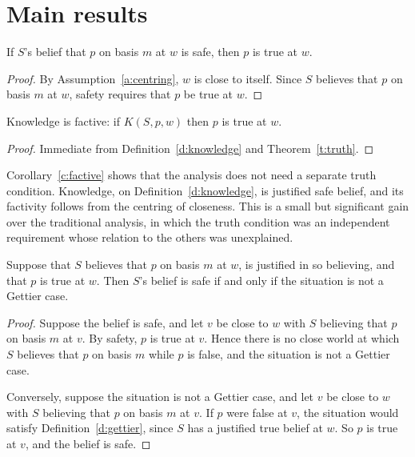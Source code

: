 \documentclass{situationist-preprint}
\begin{document}
\section{Main results}

\begin{theorem}\label{t:truth}
If $S$'s belief that $p$ on basis $m$ at $w$ is safe, then $p$ is true at $w$.
\end{theorem}

\begin{proof}
By Assumption~\ref{a:centring}, $w$ is close to itself. Since $S$ believes that $p$ on basis $m$ at $w$, safety requires that $p$ be true at $w$.
\end{proof}

\begin{corollary}\label{c:factive}
Knowledge is factive: if $K(S,p,w)$ then $p$ is true at $w$.
\end{corollary}

\begin{proof}
Immediate from Definition~\ref{d:knowledge} and Theorem~\ref{t:truth}.
\end{proof}

Corollary~\ref{c:factive} shows that the analysis does not need a separate truth condition. Knowledge, on Definition~\ref{d:knowledge}, is justified safe belief, and its factivity follows from the centring of closeness. This is a small but significant gain over the traditional analysis, in which the truth condition was an independent requirement whose relation to the others was unexplained.

\begin{theorem}[Characterization]\label{t:char}
Suppose that $S$ believes that $p$ on basis $m$ at $w$, is justified in so believing, and that $p$ is true at $w$. Then $S$'s belief is safe if and only if the situation is not a Gettier case.
\end{theorem}

\begin{proof}
Suppose the belief is safe, and let $v$ be close to $w$ with $S$ believing that $p$ on basis $m$ at $v$. By safety, $p$ is true at $v$. Hence there is no close world at which $S$ believes that $p$ on basis $m$ while $p$ is false, and the situation is not a Gettier case.

Conversely, suppose the situation is not a Gettier case, and let $v$ be close to $w$ with $S$ believing that $p$ on basis $m$ at $v$. If $p$ were false at $v$, the situation would satisfy Definition~\ref{d:gettier}, since $S$ has a justified true belief at $w$. So $p$ is true at $v$, and the belief is safe.
\end{proof}
\end{document}
